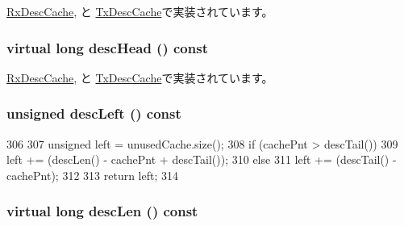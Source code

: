 \hyperlink{classIGbE_1_1RxDescCache_ae5a77c90557026fdf4fd78883f92bef9}{RxDescCache}, と \hyperlink{classIGbE_1_1TxDescCache_ae5a77c90557026fdf4fd78883f92bef9}{TxDescCache}で実装されています。\hypertarget{classIGbE_1_1DescCache_af413050780b6b8b2fe0793fff12037e3}{
\subsubsection[{descHead}]{\setlength{\rightskip}{0pt plus 5cm}virtual long descHead () const}}
\label{classIGbE_1_1DescCache_af413050780b6b8b2fe0793fff12037e3}


\hyperlink{classIGbE_1_1RxDescCache_af3d1877b6f30bdf98b95351c38d400f3}{RxDescCache}, と \hyperlink{classIGbE_1_1TxDescCache_af3d1877b6f30bdf98b95351c38d400f3}{TxDescCache}で実装されています。\hypertarget{classIGbE_1_1DescCache_ad60cb6948516cc9177fc65c07c7a0550}{
\subsubsection[{descLeft}]{\setlength{\rightskip}{0pt plus 5cm}unsigned descLeft () const}}
\label{classIGbE_1_1DescCache_ad60cb6948516cc9177fc65c07c7a0550}



\begin{DoxyCode}
306         {
307             unsigned left = unusedCache.size();
308             if (cachePnt > descTail())
309                 left += (descLen() - cachePnt + descTail());
310             else
311                 left += (descTail() - cachePnt);
312 
313             return left;
314         }
\end{DoxyCode}
\hypertarget{classIGbE_1_1DescCache_a8eb35163568b01fa17aa47b23a80f90c}{
\subsubsection[{descLen}]{\setlength{\rightskip}{0pt plus 5cm}virtual long descLen () const}}
\label{classIGbE_1_1DescCache_a8eb35163568b01fa17aa47b23a80f90c}


